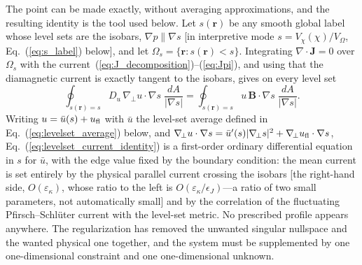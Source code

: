 \documentclass[english]{article}
\newcommand{\bB}{\mathbf{B}}
\newcommand{\bJ}{\mathbf{J}}
\newcommand{\br}{\mathbf{r}}
\newcommand{\gradperp}{\nabla_{\!\perp}}
\begin{document}
The point can be made exactly, without averaging approximations, and the resulting identity is
the tool used below. Let $s(\br)$ be any smooth global label whose level sets are the isobars,
$\nabla p\parallel\nabla s$ [in interpretive mode $s=V_\chi(\chi)/V_\Omega$, Eq.~(\ref{eq:s_label})
below], and let $\Omega_s=\{\br:s(\br)<s\}$. Integrating $\nabla\cdot\bJ=0$ over $\Omega_s$
with the current~(\ref{eq:J_decomposition})--(\ref{eq:Jpi}), and using that the diamagnetic
current is exactly tangent to the isobars, gives on every level set
\begin{equation}
\oint_{s(\br)=s}D_u\,\gradperp u\cdot\nabla s\;\frac{dA}{|\nabla s|}
=\oint_{s(\br)=s}u\,\bB\cdot\nabla s\;\frac{dA}{|\nabla s|} .
\label{eq:levelset_current_identity}
\end{equation}
Writing $u=\bar u(s)+u_{\rm fl}$ with $\bar u$ the level-set average defined in
Eq.~(\ref{eq:levelset_average}) below, and $\gradperp u\cdot\nabla s=\bar u'(s)|\gradperp
s|^{2}+\gradperp u_{\rm fl}\cdot\nabla s$, Eq.~(\ref{eq:levelset_current_identity}) is a
first-order ordinary differential equation in $s$ for $\bar u$, with the edge value fixed by the
boundary condition: the mean current is set entirely by the physical parallel current crossing
the isobars [the right-hand side, $O(\varepsilon_\kappa)$, whose ratio to the left is
$O(\varepsilon_\kappa/\epsilon_J)$---a ratio of two small parameters, not automatically small]
and by the correlation of the fluctuating Pfirsch--Schl\"uter current with the level-set metric.
No prescribed profile appears anywhere. The regularization has removed the unwanted singular
nullspace and the wanted physical one together, and the system must be supplemented by one
one-dimensional constraint and one one-dimensional unknown.
\end{document}
